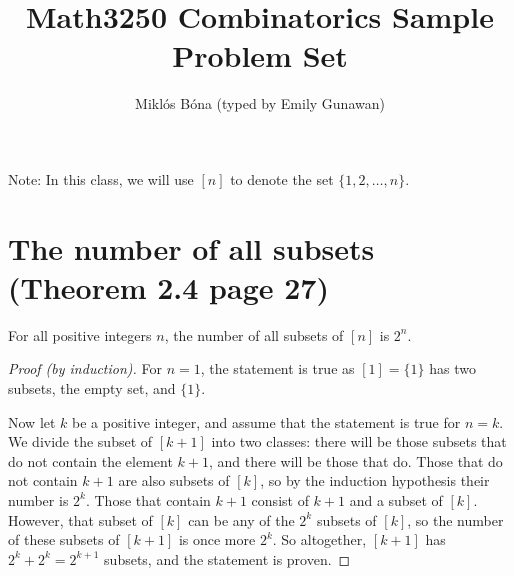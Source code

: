 \documentclass[12pt]{amsart}
\title{Math3250 Combinatorics Sample Problem Set}
\author{Mikl\'os B\'ona (typed by Emily Gunawan)}
\date{}
\begin{document}
\maketitle



Note: In this class, we will use $[n]$ to denote the set $\{1,2,\dots,n \}$.

\section{The number of all subsets (Theorem 2.4 page 27)}
For all positive integers $n$, the number of all subsets of $[n]$ is $2^n$.

\begin{proof}[Proof (by induction)]
For $n=1$, the statement is true as $[1]=\{1\}$ has two subsets, the empty set, and $\{1\}$.

Now let $k$ be a positive integer, and assume that the statement is true for $n=k$. We divide the subset of $[k+1]$ into two classes: there will be those subsets that do not contain the element $k+1$, and there will be those that do. Those that do not contain $k+1$ are also subsets of $[k]$, so by the induction hypothesis their number is $2^k$. Those that contain $k+1$ consist of $k+1$ and a subset of $[k]$. However, that subset of $[k]$ can be any of the $2^k$ subsets of $[k]$, so the number of these subsets of $[k+1]$ is once more $2^k$. So altogether, $[k+1]$ has $2^k + 2^k = 2^{k+1}$ subsets, and the statement is proven. 
\end{proof}
\end{document}
